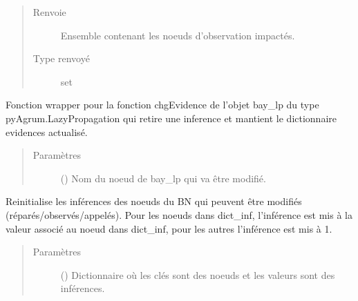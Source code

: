 \documentclass[letterpaper,10pt,french]{sphinxmanual}
\begin{document}
\begin{fulllineitems}
\begin{fulllineitems}
\begin{quote}
\begin{description}
\item[{Renvoie}] \leavevmode
{} \textendash{} Ensemble contenant les noeuds d’observation impactés.

\item[{Type renvoyé}] \leavevmode
set

\end{description}\end{quote}

\end{fulllineitems}


\begin{fulllineitems}
\label{\detokenize{index:DecisionTheoreticTroubleshooting.TroubleShootingProblem.remove_evidence}}
Fonction wrapper pour la fonction chgEvidence de l’objet bay\_lp du
type pyAgrum.LazyPropagation qui retire une inference et mantient le
dictionnaire evidences actualisé.
\begin{quote}\begin{description}
\item[{Paramètres}] \leavevmode
{} () \textendash{} Nom du noeud de bay\_lp qui va être modifié.

\end{description}\end{quote}

\end{fulllineitems}


\begin{fulllineitems}
\label{\detokenize{index:DecisionTheoreticTroubleshooting.TroubleShootingProblem.reset_bay_lp}}
Reinitialise les inférences des noeuds du BN qui peuvent être modifiés
(réparés/observés/appelés). Pour les noeuds dans dict\_inf, l’inférence
est mis à la valeur associé au noeud dans dict\_inf, pour les autres
l’inférence est mis à 1.
\begin{quote}\begin{description}
\item[{Paramètres}] \leavevmode
{} (\sphinxstyleliteralemphasis{\sphinxupquote{, }}) \textendash{} Dictionnaire où les clés sont des noeuds et les valeurs sont des
inférences.


\end{description}
\end{quote}
\end{fulllineitems}
\end{fulllineitems}
\end{document}
